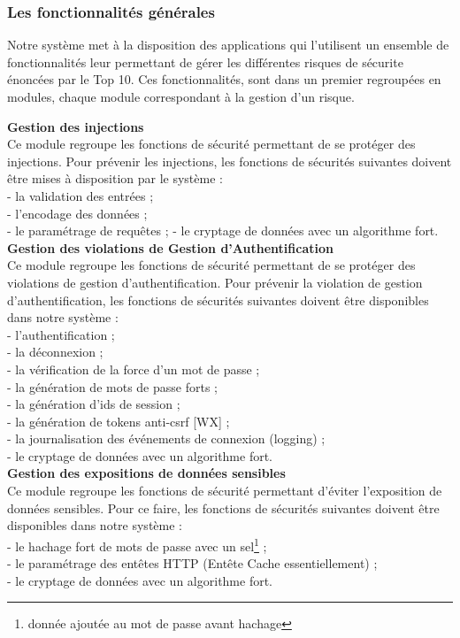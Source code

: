 \subsubsection{Les fonctionnalités générales}
Notre système met à la disposition des applications qui l'utilisent un ensemble de fonctionnalités leur permettant de gérer les différentes risques de sécurite énoncées par le Top 10. Ces fonctionnalités, sont dans un premier regroupées en modules, chaque module correspondant à la gestion d'un risque.

\textbf{\RIGHTarrow Gestion des injections}\\
Ce module regroupe les fonctions de sécurité permettant de se protéger des injections. Pour prévenir les injections, les fonctions de sécurités suivantes doivent être mises à disposition par le système : \\
- la validation des entrées ; \\
- l’encodage des données ; \\
- le paramétrage de requêtes ;
- le cryptage de données avec un algorithme fort.\\

\textbf{\RIGHTarrow Gestion des violations de Gestion d’Authentification}\\
Ce module regroupe les fonctions de sécurité permettant de se protéger des violations de gestion d'authentification. Pour prévenir la violation de gestion d'authentification, les fonctions de sécurités suivantes doivent être disponibles dans notre système : \\
- l'authentification ;\\
- la déconnexion ;\\
- la vérification de la force d'un mot de passe ; \\
- la génération de mots de passe forts ; \\ 
- la génération d'ids de session ; \\
- la génération de tokens anti-csrf [WX] ; \\
- la journalisation des événements de connexion (logging) ; \\
- le cryptage de données avec un algorithme fort.\\

\textbf{\RIGHTarrow Gestion des expositions de données sensibles}\\
Ce module regroupe les fonctions de sécurité permettant d'éviter l'exposition de données sensibles. Pour ce faire, les fonctions de sécurités suivantes doivent être disponibles dans notre système : \\
- le hachage fort de mots de passe avec un sel\footnote{donnée ajoutée au mot de passe avant hachage} ; \\
- le paramétrage des entêtes HTTP (Entête Cache essentiellement) ; \\
- le cryptage de données avec un algorithme fort.\\

